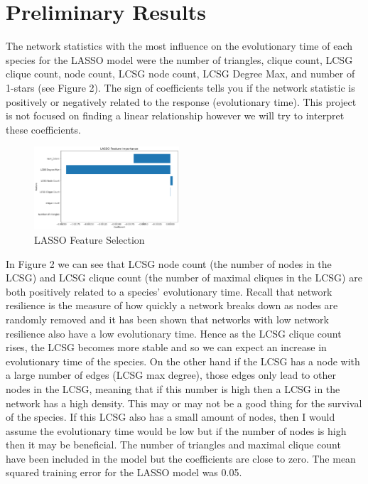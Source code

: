 \documentclass[12pt]{article}
\begin{document}
\section{Preliminary Results}
The network statistics with the most influence on the evolutionary time of each species for the LASSO model were the number of triangles, clique count, LCSG clique count, node count, LCSG node count, LCSG Degree Max, and number of 1-stars (see Figure 2). The sign of coefficients tells you if the network statistic is positively or negatively related to the response (evolutionary time). This project is not focused on finding a linear relationship however we will try to interpret these coefficients.
\begin{figure}
  \vspace{-20pt}
  \begin{center}
    \includegraphics[width=0.48\textwidth]{PPIN_fig3}
  \end{center}
  \vspace{-20pt}
  \caption{LASSO Feature Selection}
  \vspace{-10pt}
\end{figure}
\indent In Figure 2 we can see that LCSG node count (the number of nodes in the LCSG) and LCSG clique count (the number of maximal cliques in the LCSG) are both positively related to a species' evolutionary time.  Recall that network resilience is the measure of how quickly a network breaks down as nodes are randomly removed and it has been shown that networks with low network resilience also have a low evolutionary time. Hence as the LCSG clique count rises, the LCSG becomes more stable and so we can expect an increase in evolutionary time of the species. On the other hand if the LCSG has a node with a large number of edges (LCSG max degree), those edges only lead to other nodes in the LCSG, meaning that if this number is high then a LCSG in the network has a high density. This may or may not be a good thing for the survival of the species. If this LCSG also has a small amount of nodes, then I would assume the evolutionary time would be low but if the number of nodes is high then it may be beneficial. The number of triangles and maximal clique count have been included in the model but the coefficients are close to zero. The mean squared training error for the LASSO model was 0.05.
\end{document}
